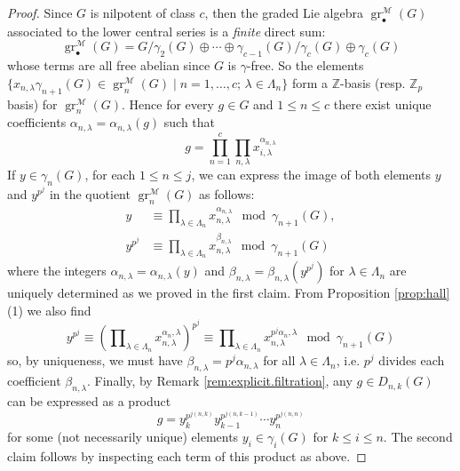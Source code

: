 \documentclass{amsart}
\theoremstyle{plain}
\theoremstyle{definition}
\numberwithin{theorem}{section}
\numberwithin{equation}{section}
\newcommand{\grM}{\operatorname{gr}^{\mathscr M}}
\newcommand{\Z}{\mathbb Z}
\begin{document}
\begin{proof}
    Since $G$ is nilpotent of class $c$, then the graded Lie algebra $\grM_\bullet(G)$ associated to the lower central series is a \emph{finite} direct sum:
    \[
        \grM_\bullet(G) = G/\gamma_2(G) \oplus \cdots \oplus \gamma_{c-1}(G)/\gamma_c(G) \oplus \gamma_c(G)
    \]
    whose terms are all free abelian since $G$ is $\gamma$-free. So the elements $\{ x_{n, \lambda}\gamma_{n+1}(G) \in \grM_n(G) \mid n = 1, \dots, c; \, \lambda \in \Lambda_n\}$ form a $\Z$-basis (resp. $\Z_p$ basis) for $\grM_n(G)$.
    Hence for every $g \in G$ and $1 \leq n \leq c$ there exist unique coefficients $\alpha_{n, \lambda} = \alpha_{n, \lambda}(g)$ such that
    \[
        g = \prod_{n=1}^c\prod_{n, \lambda} x_{i, \lambda}^{\alpha_{n, \lambda}}
    \]
\noindent
    If $y \in \gamma_n(G)$, for each $1 \leq n \leq j$, we can express the image of both elements $y$ and $y^{p^j}$ in the quotient $\grM_n(G)$ as follows:
    \begin{align*}
        y &\equiv \prod\nolimits_{\lambda \in \Lambda_n} x_{n, \lambda}^{\alpha_{n, \lambda}} \mod \gamma_{n+1}(G), \\
        y^{p^j} &\equiv \prod\nolimits_{\lambda \in \Lambda_n} x_{n, \lambda}^{\beta_{n, \lambda}} \mod \gamma_{n+1}(G)
    \end{align*}
    where the integers $\alpha_{n, \lambda} = \alpha_{n, \lambda}(y)$ and $\beta_{n, \lambda} = \beta_{n, \lambda}(y^{p^j})$ for $\lambda \in \Lambda_n$ are uniquely determined as we proved in the first claim.
    From Proposition \ref{prop:hall} (1) we also find
    \[
        y^{p^j} \equiv \left( \prod\nolimits_{\lambda\in\Lambda_n} x_{n,\lambda}^{\alpha_n,\lambda}\right)^{p^j} \equiv \prod\nolimits_{\lambda\in\Lambda_n} x_{n,\lambda}^{p^j\alpha_n,\lambda} \mod \gamma_{n+1}(G)
    \]
    so, by uniqueness, we must have $\beta_{n, \lambda} = p^j \alpha_{n, \lambda}$ for all $\lambda \in \Lambda_n$, i.e. $p^j$ divides each coefficient $\beta_{n, \lambda}$.
\noindent
    Finally, by Remark \ref{rem:explicit.filtration}, any $g \in D_{n, k}(G)$ can be expressed as a product
    \[
        g = y_k^{p^{j(n, k)}} y_{k-1}^{p^{j(n, k-1)}} \cdots y_{n}^{p^{j(n, n)}}
    \]
    for some (not necessarily unique) elements $y_i \in \gamma_i(G)$ for $k \leq i \leq n$. The second claim follows by inspecting each term of this product as above. 
\end{proof}
\end{document}
